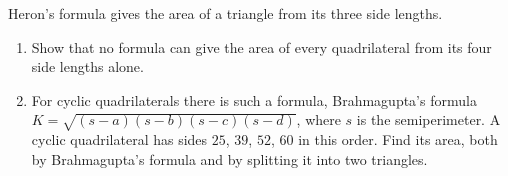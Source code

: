 Heron's formula gives the area of a triangle from its three side lengths.
\begin{enumerate}
\item[(a)] Show that no formula can give the area of every quadrilateral from its four side lengths alone.
\item[(b)] For cyclic quadrilaterals there is such a formula, Brahmagupta's formula $K=\sqrt{(s-a)(s-b)(s-c)(s-d)}$, where $s$ is the semiperimeter. A cyclic quadrilateral has sides $25$, $39$, $52$, $60$ in this order. Find its area, both by Brahmagupta's formula and by splitting it into two triangles.
\end{enumerate}
